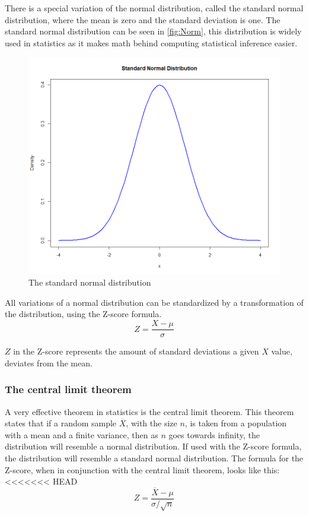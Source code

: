 There is a special variation of the normal distribution, called the standard normal distribution, where the mean is zero and the standard deviation is one. The standard normal distribution can be seen in \autoref{fig:Norm}, this distribution is widely used in statistics as it makes math behind computing statistical inference easier.
\begin{figure}[h!]
	\centering
	\begin{minipage}{0.80\textwidth}
		\centering
		\includegraphics[width=\linewidth]{billder/Normal distribution.png}
		\caption{The standard normal distribution}
		\label{fig:Norm}
	\end{minipage}\hfill
\end{figure}
All variations of a normal distribution can be standardized by a transformation of the distribution, using the Z-score formula.
\newline
\begin{equation}
Z=\frac{X-\mu}{\sigma}
\end{equation}


$Z$ in the Z-score represents the amount of standard deviations a given $X$ value, deviates from the mean.

\subsubsection{The central limit theorem}
A very effective theorem in statistics is the central limit theorem. This theorem states that if a random sample $\overline{X}$, with the size $n$, is taken from a population with a mean and a finite variance, then as $n$ goes towards infinity, the distribution will resemble a normal distribution. If used with the Z-score formula, the distribution will resemble a standard normal distribution. The formula for the Z-score, when in conjunction with the central limit theorem, looks like this:
<<<<<<< HEAD
\begin{equation}
Z=\frac{\overline{X}-\mu}{\sigma/\sqrt{n}}
\end{equation}



